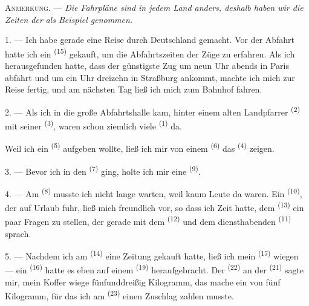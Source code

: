 \VUsaut{4.0mm}
\VUsaut{2.4mm}
\VUsaut{3.4mm}
\textsc{Anmerkung.} --- \textit{Die Fahrpläne sind in jedem Land anders, deshalb
haben wir die Zeiten der}
 \textit{als Beispiel genommen.}

1. --- Ich habe gerade eine Reise durch Deutschland gemacht. Vor der Abfahrt hatte
ich ein  \textsuperscript{(15)} gekauft, um die Abfahrtszeiten der
Züge zu erfahren. Als ich herausgefunden hatte, dass der günstigste Zug um neun Uhr
abends in Paris abfährt und um ein Uhr dreizehn in Straßburg ankommt, machte ich
mich zur Reise fertig, und am nächsten Tag ließ ich mich zum Bahnhof fahren.

2. --- Als ich in die große Abfahrtshalle kam, hinter einem alten Landpfarrer
\textsuperscript{(2)} mit seiner  \textsuperscript{(3)}, waren
schon ziemlich viele  \textsuperscript{(1)} da.

Weil ich ein  \textsuperscript{(5)} aufgeben wollte, ließ ich mir
von einem  \textsuperscript{(6)} das 
\textsuperscript{(4)} zeigen.

3. --- Bevor ich in den  \textsuperscript{(7)} ging, holte ich mir
eine  \textsuperscript{(9)}.

4. --- Am  \textsuperscript{(8)} musste ich nicht lange
warten, weil kaum Leute da waren. Ein  \textsuperscript{(10)}, der auf
Urlaub fuhr, ließ mich freundlich vor, so dass ich Zeit hatte, dem
 \textsuperscript{(13)} ein paar Fragen zu stellen, der
gerade mit dem  \textsuperscript{(12)} und dem
diensthabenden  \textsuperscript{(11)} sprach.

\VUsaut{3.0mm}

5. --- Nachdem ich am  \textsuperscript{(14)} eine Zeitung gekauft
hatte, ließ ich mein  \textsuperscript{(17)} wiegen --- ein
 \textsuperscript{(16)} hatte es eben auf einem
 \textsuperscript{(19)} heraufgebracht. Der 
\textsuperscript{(22)} an der  \textsuperscript{(21)} sagte mir, mein
Koffer wiege fünfunddreißig Kilogramm, das mache ein 
von fünf Kilogramm, für das ich am 
\textsuperscript{(23)} einen Zuschlag zahlen musste.

